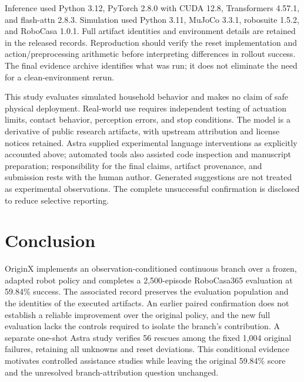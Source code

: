 \documentclass[10pt,twocolumn,letterpaper]{article}
\begin{document}
Inference used Python 3.12, PyTorch 2.8.0 with CUDA 12.8, Transformers 4.57.1, and flash-attn 2.8.3. Simulation used Python 3.11, MuJoCo 3.3.1, robosuite 1.5.2, and RoboCasa 1.0.1. Full artifact identities and environment details are retained in the released records. Reproduction should verify the reset implementation and action/preprocessing arithmetic before interpreting differences in rollout success. The final evidence archive identifies what was run; it does not eliminate the need for a clean-environment rerun.


This study evaluates simulated household behavior and makes no claim of safe physical deployment. Real-world use requires independent testing of actuation limits, contact behavior, perception errors, and stop conditions. The model is a derivative of public research artifacts, with upstream attribution and license notices retained. Astra supplied experimental language interventions as explicitly accounted above; automated tools also assisted code inspection and manuscript preparation; responsibility for the final claims, artifact provenance, and submission rests with the human author. Generated suggestions are not treated as experimental observations. The complete unsuccessful confirmation is disclosed to reduce selective reporting.


\section{Conclusion}

OriginX implements an observation-conditioned continuous branch over a frozen, adapted robot policy and completes a 2,500-episode RoboCasa365 evaluation at 59.84\% success. The associated record preserves the evaluation population and the identities of the executed artifacts. An earlier paired confirmation does not establish a reliable improvement over the original policy, and the new full evaluation lacks the controls required to isolate the branch's contribution. A separate one-shot Astra study verifies 56 rescues among the fixed 1,004 original failures, retaining all unknowns and reset deviations. This conditional evidence motivates controlled assistance studies while leaving the original 59.84\% score and the unresolved branch-attribution question unchanged.
\end{document}
